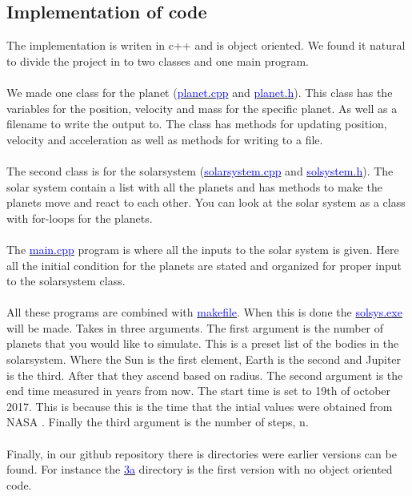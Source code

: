 \subsection{Implementation of code}

The implementation is writen in c++ and is object oriented. We found it natural to divide the project in to two classes and one main program. 
\\
\\
We made one class for the planet (\href{https://github.com/erikfsk/Project-3/blob/master/Project3/planet.cpp}{\textcolor{blue}{planet.cpp}} and \href{https://github.com/erikfsk/Project-3/blob/master/Project3/planet.h}{\textcolor{blue}{planet.h}}). This class has the variables for the position, velocity and mass for the specific planet. As well as a filename to write the output to. The class has methods for updating position, velocity and acceleration as well as methods for writing to a file. 
\\
\\
The second class is for the solarsystem (\href{https://github.com/erikfsk/Project-3/blob/master/Project3/solarsystem.cpp}{\textcolor{blue}{solarsystem.cpp}} and \href{https://github.com/erikfsk/Project-3/blob/master/Project3/solarsystem.h}{\textcolor{blue}{solsystem.h}}). The solar system contain a list with all the planets and has methods to make the planets move and react to each other. You can look at the solar system as a class with for-loops for the planets. 
\\
\\
The \href{https://github.com/erikfsk/Project-3/blob/master/Project3/main.cpp}{\textcolor{blue}{main.cpp}} program is where all the inputs to the solar system is given. Here all the initial condition for the planets are stated and organized for proper input to the solarsystem class. 
\\
\\
All these programs are combined with \href{https://github.com/erikfsk/Project-3/blob/master/Project3/makefile}{\textcolor{blue}{makefile}}. When this is done the \href{https://github.com/erikfsk/Project-3/blob/master/Project3/solsys.exe}{\textcolor{blue}{solsys.exe}} will be made. Takes in three arguments. The first argument is the number of planets that you would like to simulate. This is a preset list of the bodies in the solarsystem. Where the Sun is the first element, Earth is the second and Jupiter is the third. After that they ascend based on radius. The second argument is the end time measured in years from now. The start time is set to 19th of october 2017. This is because this is the time that the intial values were obtained from NASA . Finally the third argument is the number of steps, n. 
\\
\\
Finally, in our github repository there is directories were earlier versions can be found. For instance the 
\href{https://github.com/erikfsk/Project-3/tree/master/Project3/3a}{\textcolor{blue}{3a}} directory is the first version with no object oriented code. 


